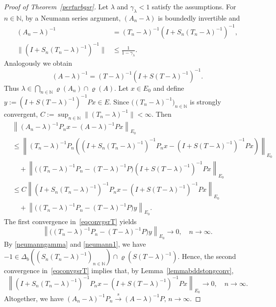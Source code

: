 \documentclass[a4paper,reqno]{amsart}
\begin{document}
{\begin{proof}[Proof of Theorem~{\rm\ref{perturbgsr}}]
 Let $\lambda$ and $\gamma_\lambda<1$ satisfy the assumptions.
For $n\in{\mathbb{N}}$, by a Neumann series argument, $(A_n-\lambda)$ is boundedly invertible and
\begin{equation}
\begin{aligned}\label{neumanngamma}
(A_n-\lambda)^{-1}&=(T_n-\lambda)^{-1}\left(I+S_n(T_n-\lambda)^{-1}\right)^{-1}, \\ 
\big\|\left(I+S_n(T_n-\lambda)^{-1}\right)^{-1}\big\|&\leq\frac{1}{1-\gamma_\lambda}.
\end{aligned}
\end{equation}
Analogously we obtain 
\begin{equation} (A-\lambda)^{-1}=(T-\lambda)^{-1}\left(I+S(T-\lambda)^{-1}\right)^{-1}.\label{neumann1}\end{equation}
Thus $\lambda\in\underset{n\in{\mathbb{N}}}{\bigcap}\varrho(A_n)\cap\varrho(A)$. Let $x\in E_0$ and define
$y:=\left(I+S(T-\lambda)^{-1}\right)^{-1}Px\in E$. 
Since $\big((T_n-\lambda)^{-1}\big)_{n\in{\mathbb{N}}}$ is strongly convergent, $C:=\sup_{n\in{\mathbb{N}}}\|(T_n-\lambda)^{-1}\|<\infty$.
Then 
\begin{align*}
 &\left\|(A_n-\lambda)^{-1}P_nx-(A-\lambda)^{-1}Px\right\|_{E_0}\\
&\leq \left\|(T_n-\lambda)^{-1}P_n\left(\left(I+S_n(T_n-\lambda)^{-1}\right)^{-1}P_nx-\left(I+S(T-\lambda)^{-1}\right)^{-1}Px\right)\right\|_{E_0}\\
&\quad +\left\|\big((T_n-\lambda)^{-1}P_n-(T-\lambda)^{-1}P\big)\left(I+S(T-\lambda)^{-1}\right)^{-1}Px\right\|_{E_0}\\
&\leq C \left\|\left(I+S_n(T_n-\lambda)^{-1}\right)^{-1}P_nx-\left(I+S(T-\lambda)^{-1}\right)^{-1}Px\right\|_{E_0}\\
&\quad +\left\|\big((T_n-\lambda)^{-1}P_n-(T-\lambda)^{-1}P\big)y\right\|_{E_0}.
\end{align*}
The first convergence in~\eqref{eqconvgsrT} yields $$\left\|\big((T_n-\lambda)^{-1}P_n-(T-\lambda)^{-1}P\big)y\right\|_{E_0}{\longrightarrow} 0, \quad n\to\infty.$$
By \eqref{neumanngamma} and \eqref{neumann1}, we have $-1\in \Delta_b\left((S_n(T_n-\lambda)^{-1})_{n\in{\mathbb{N}}}\right)\cap\varrho(S(T-\lambda)^{-1})$.
Hence, the second convergence in~\eqref{eqconvgsrT} implies that, by Lemma~\ref{lemmabddstongconv},
$$\left\|\left(I+S_n(T_n-\lambda)^{-1}\right)^{-1}P_nx-\left(I+S(T-\lambda)^{-1}\right)^{-1}Px\right\|_{E_0}{\longrightarrow} 0,\quad n\to\infty.$$
Altogether, we have $(A_n-\lambda)^{-1}P_n{\stackrel{s}{\rightarrow}}(A-\lambda)^{-1}P, \, n\to\infty.$
 \end{proof}

}
\end{document}

